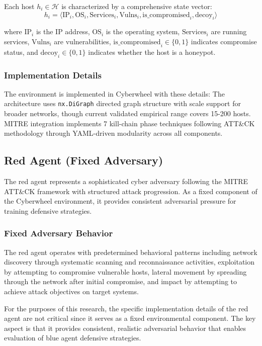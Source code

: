\documentclass[12pt,oneside]{article}
\begin{document}
Each host $h_i \in \mathcal{H}$ is characterized by a comprehensive state vector:
\begin{equation}
h_i = \langle \text{IP}_i, \text{OS}_i, \text{Services}_i, \text{Vulns}_i, \text{is\_compromised}_i, \text{decoy}_i \rangle
\end{equation}

where $\text{IP}_i$ is the IP address, $\text{OS}_i$ is the operating system, $\text{Services}_i$ are running services, $\text{Vulns}_i$ are vulnerabilities, $\text{is\_compromised}_i \in \{0,1\}$ indicates compromise status, and $\text{decoy}_i \in \{0,1\}$ indicates whether the host is a honeypot.

\subsubsection{Implementation Details}
The environment is implemented in Cyberwheel with these details:
The architecture uses \texttt{nx.DiGraph} directed graph structure with scale support for broader networks, though current validated empirical range covers 15-200 hosts. MITRE integration implements 7 kill-chain phase techniques following ATT\&CK methodology through YAML-driven modularity across all components.


\subsection{Red Agent (Fixed Adversary)}

The red agent represents a sophisticated cyber adversary following the MITRE ATT\&CK framework with structured attack progression. As a fixed component of the Cyberwheel environment, it provides consistent adversarial pressure for training defensive strategies.

\subsubsection{Fixed Adversary Behavior}
The red agent operates with predetermined behavioral patterns including network discovery through systematic scanning and reconnaissance activities, exploitation by attempting to compromise vulnerable hosts, lateral movement by spreading through the network after initial compromise, and impact by attempting to achieve attack objectives on target systems.

For the purposes of this research, the specific implementation details of the red agent are not critical since it serves as a fixed environmental component. The key aspect is that it provides consistent, realistic adversarial behavior that enables evaluation of blue agent defensive strategies.
\end{document}
